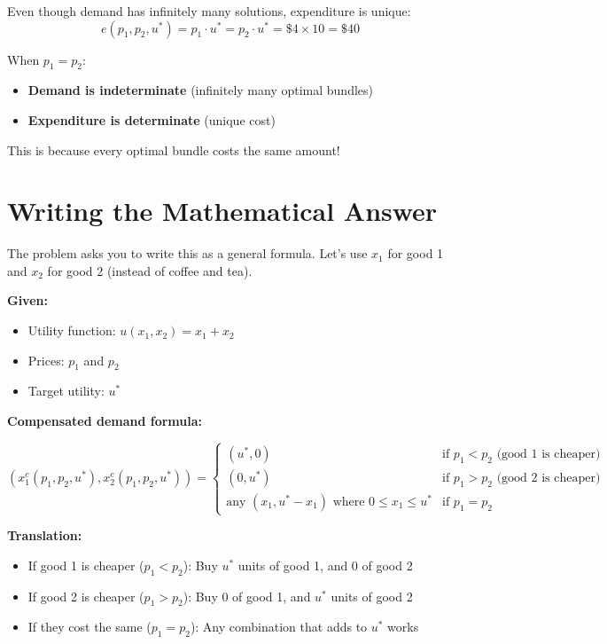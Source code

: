 \documentclass[11pt]{article}
\begin{document}
Even though demand has infinitely many solutions, expenditure is unique:
$$e(p_1, p_2, u^*) = p_1 \cdot u^* = p_2 \cdot u^* = \$4 \times 10 = \$40$$

\begin{tcolorbox}[colback=purple!5!white,colframe=purple!75!black,title=Key Insight]
When $p_1 = p_2$:
\begin{itemize}
\item \textbf{Demand is indeterminate} (infinitely many optimal bundles)
\item \textbf{Expenditure is determinate} (unique cost)
\end{itemize}

This is because every optimal bundle costs the same amount!
\end{tcolorbox}

\section{Writing the Mathematical Answer}

The problem asks you to write this as a general formula. Let's use $x_1$ for good 1 and $x_2$ for good 2 (instead of coffee and tea).

\textbf{Given:}
\begin{itemize}
\item Utility function: $u(x_1, x_2) = x_1 + x_2$
\item Prices: $p_1$ and $p_2$
\item Target utility: $u^*$
\end{itemize}

\textbf{Compensated demand formula:}

\begin{tcolorbox}[colback=yellow!10!white,colframe=orange!75!black,title=Answer to Problem 1a]
\begin{equation}
(x_1^c(p_1, p_2, u^*), x_2^c(p_1, p_2, u^*)) =
\begin{cases}
(u^*, 0) & \text{if } p_1 < p_2 \text{ (good 1 is cheaper)} \\
(0, u^*) & \text{if } p_1 > p_2 \text{ (good 2 is cheaper)} \\
\text{any } (x_1, u^* - x_1) \text{ where } 0 \leq x_1 \leq u^* & \text{if } p_1 = p_2
\end{cases}
\end{equation}
\end{tcolorbox}

\textbf{Translation:}
\begin{itemize}
\item If good 1 is cheaper ($p_1 < p_2$): Buy $u^*$ units of good 1, and 0 of good 2
\item If good 2 is cheaper ($p_1 > p_2$): Buy 0 of good 1, and $u^*$ units of good 2
\item If they cost the same ($p_1 = p_2$): Any combination that adds to $u^*$ works
\end{itemize}
\end{document}
